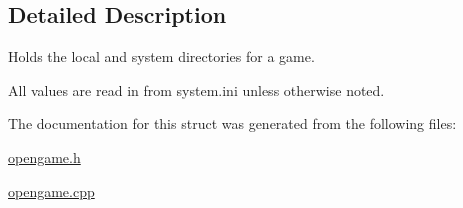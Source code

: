\subsection{Detailed Description}
Holds the local and system directories for a game. 

All values are read in from system.\-ini unless otherwise noted. 

The documentation for this struct was generated from the following files\-:\begin{DoxyCompactItemize}
\item 
\hyperlink{opengame_8h}{opengame.\-h}\item 
\hyperlink{opengame_8cpp}{opengame.\-cpp}\end{DoxyCompactItemize}
